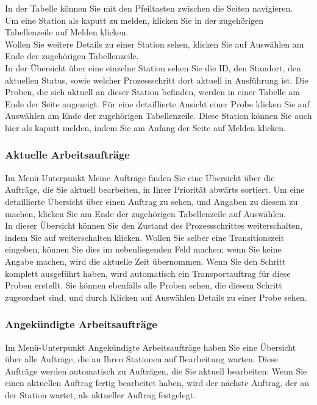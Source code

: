 \documentclass[enabledeprecatedfontcommands,fontsize=12pt,paper=a4,twoside]{scrartcl}
\begin{document}
In der Tabelle können Sie mit den Pfeiltasten zwischen die Seiten navigieren. \\

Um eine Station als kaputt zu melden, klicken Sie in der zugehörigen Tabellenzeile auf Melden klicken. \\

Wollen Sie weitere Details zu einer Station sehen, klicken Sie auf Auswählen am Ende der zugehörigen Tabellenzeile. \\

In der Übersicht über eine einzelne Station sehen Sie die ID, den Standort, den aktuellen Status, sowie welcher Prozessschritt dort aktuell in Ausführung ist. Die Proben, die sich aktuell an dieser Station befinden, werden in einer Tabelle am Ende der Seite angezeigt. Für eine detaillierte Ansicht einer Probe klicken Sie auf Auswählen am Ende der zugehörigen Tabellenzeile. Diese Station können Sie auch hier als kaputt melden, indem Sie am Anfang der Seite auf Melden klicken. \\

\subsubsection{Aktuelle Arbeitsaufträge}
Im Menü-Unterpunkt Meine Aufträge finden Sie eine Übersicht über die Aufträge, die Sie aktuell bearbeiten, in Ihrer Priorität abwärts sortiert. Um eine detaillierte Übersicht über einen Auftrag zu sehen, und Angaben zu diesem zu machen, klicken Sie am Ende der zugehörigen Tabellenzeile auf Auswählen. \\

In dieser Übersicht können Sie den Zustand des Prozessschrittes weiterschalten, indem Sie auf weiterschalten klicken. Wollen Sie selber eine Transitionszeit eingeben, können Sie dies im nebenliegenden Feld machen; wenn Sie keine Angabe machen, wird die aktuelle Zeit übernommen. Wenn Sie den Schritt komplett ausgeführt haben, wird automatisch ein Transportauftrag für diese Proben erstellt. Sie können ebenfalls alle Proben sehen, die diesem Schritt zugeordnet sind, und durch Klicken auf Auswählen Details zu einer Probe sehen. \\

\subsubsection{Angekündigte Arbeitsaufträge}
Im Menü-Unterpunkt Angekündigte Arbeitsaufträge haben Sie eine Übersicht über alle Aufträge, die an Ihren Stationen auf Bearbeitung warten. Diese Aufträge werden automatisch zu Aufträgen, die Sie aktuell bearbeiten: Wenn Sie einen aktuellen Auftrag fertig bearbeitet haben, wird der nächste Auftrag, der an der Station wartet, als aktueller Auftrag festgelegt. \\
\end{document}
